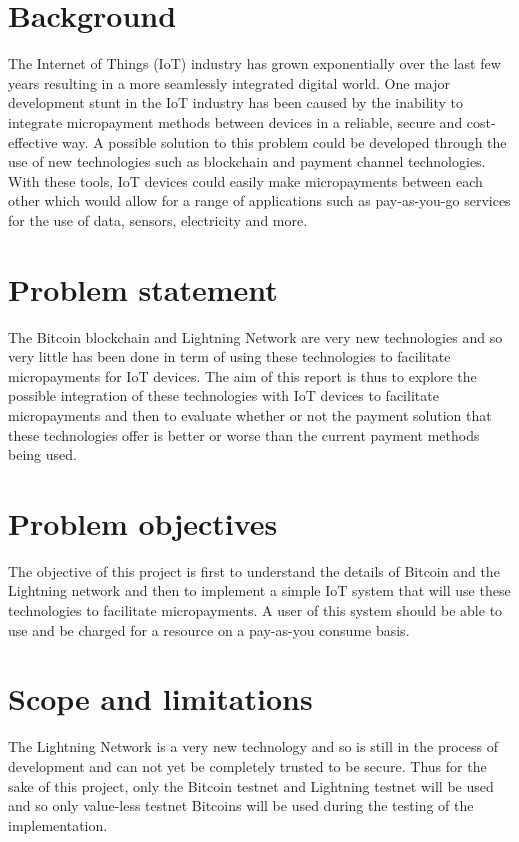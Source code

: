 
\section{Background}

The Internet of Things (IoT) industry has grown exponentially over the last few years resulting in a more seamlessly integrated digital world. One major development stunt in the IoT industry has been caused by the inability to integrate micropayment methods between devices in a reliable, secure and cost-effective way. A possible solution to this problem could be developed through the use of new technologies such as blockchain and payment channel technologies. With these tools, IoT devices could easily make micropayments between each other which would allow for a range of applications such as pay-as-you-go services for the use of data, sensors, electricity and more.

\section{Problem statement}

The Bitcoin blockchain and Lightning Network are very new technologies and so very little has been done in term of using these technologies  to facilitate micropayments for IoT devices. The aim of this report is thus to explore the possible integration of these technologies with IoT devices to facilitate micropayments and then to evaluate whether or not the payment solution that these technologies offer is better or worse than the current payment methods being used.

\section{Problem objectives}

The objective of this project is first to understand the details of Bitcoin and the Lightning network and then to implement a simple IoT system that will use these technologies to facilitate micropayments. A user of this system should be able to use and be charged for a resource on a pay-as-you consume basis.

\section{Scope and limitations}

The Lightning Network is a very new technology and so is still in the process of development and can not yet be completely trusted to be secure. Thus for the sake of this project, only the Bitcoin testnet and Lightning testnet will be used and so only value-less testnet Bitcoins will be used during  the testing of the implementation.

